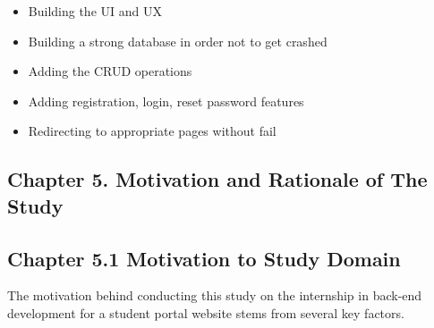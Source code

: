 \documentclass[12pt]{article}
\begin{document}
\begin{itemize}
         \item Building the UI and UX  
         \item Building a strong database in order not to get crashed  
         \item Adding the CRUD operations 
         \item Adding registration, login, reset password features
         \item Redirecting to appropriate pages without fail 
\end{itemize}
\pagebreak
\newpage
\begin{center}\section*{\Large {Chapter 5. Motivation and Rationale of The
Study}}\end{center}
\bigskip
\begin{center}\subsection*{Chapter 5.1 Motivation to Study Domain}\end{center}
\medskip
\hspace{1cm}The motivation behind conducting this study on the internship in back-end development for a student portal website stems from several key factors.\\
\medskip
\end{document}
